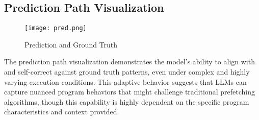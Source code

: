 \documentclass[sigconf,authorversion,nonacm]{acmart}
\begin{document}
\subsection{Prediction Path Visualization}

\begin{figure}[H]
  \texttt{[image: pred.png]}
  \caption{Prediction and Ground Truth}
  \label{fig:predPath}
\end{figure}

The prediction path visualization demonstrates the model's ability to align with and self-correct against ground truth patterns, even under complex and highly varying execution conditions. This adaptive behavior suggests that LLMs can capture nuanced program behaviors that might challenge traditional prefetching algorithms, though this capability is highly dependent on the specific program characteristics and context provided.













\end{document}
